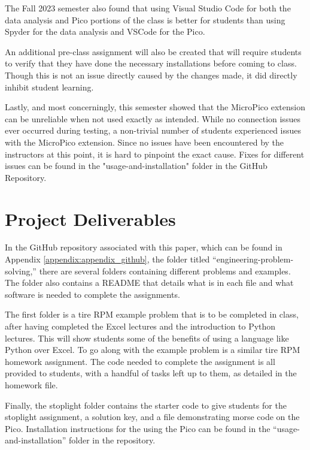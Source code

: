 The Fall 2023 semester also found that using Visual Studio Code for both the data analysis and Pico portions of the
class is better for students than using Spyder for the data analysis and VSCode for the Pico. 

An additional pre-class assignment will also be created that will require students to verify that they have
done the necessary installations before coming to class. Though this is not an issue directly caused by the changes
made, it did directly inhibit student learning.

Lastly, and most concerningly, this semester showed that the MicroPico extension can be unreliable when not used
exactly as intended. While no connection issues ever occurred during testing, a non-trivial number of students
experienced issues with the MicroPico extension. Since no issues have been encountered by the instructors at this
point, it is hard to pinpoint the exact cause. Fixes for different issues can be found in the 
"usage-and-installation" folder in the GitHub Repository.

\section{Project Deliverables}

In the GitHub repository associated with this paper, which can be found in Appendix \ref{appendix:appendix_github},
the folder titled ``engineering-problem-solving,'' there are several folders containing different problems and 
examples. The folder also contains a README that details what is in each file and what software is needed to 
complete the assignments. 

The first folder is a tire RPM example problem that is to be completed in class, after having completed the Excel
lectures and the introduction to Python lectures. This will show students some of the benefits of using a
language like Python over Excel. To go along with the example problem is a similar tire RPM homework assignment.
The code needed to complete the assignment is all provided to students, with a handful of tasks left up to them,
as detailed in the homework file. 

Finally, the stoplight folder contains the starter code to give students for the stoplight assignment, a solution
key, and a file demonstrating morse code on the Pico. Installation instructions for the using the Pico can be found
in the ``usage-and-installation'' folder in the repository.

